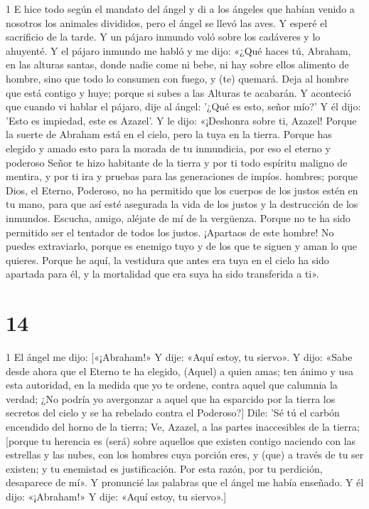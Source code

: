 \par 1 E hice todo según el mandato del ángel y di a los ángeles que habían venido a nosotros los animales divididos, pero el ángel se llevó las aves. Y esperé el sacrificio de la tarde. Y un pájaro inmundo voló sobre los cadáveres y lo ahuyenté. Y el pájaro inmundo me habló y me dijo: «¿Qué haces tú, Abraham, en las alturas santas, donde nadie come ni bebe, ni hay sobre ellos alimento de hombre, sino que todo lo consumen con fuego, y (te) quemará. Deja al hombre que está contigo y huye; porque si subes a las Alturas te acabarán. Y aconteció que cuando vi hablar el pájaro, dije al ángel: '¿Qué es esto, señor mío?' Y él dijo: 'Esto es impiedad, este es Azazel'. Y le dijo: «¡Deshonra sobre ti, Azazel! Porque la suerte de Abraham está en el cielo, pero la tuya en la tierra. Porque has elegido y amado esto para la morada de tu inmundicia, por eso el eterno y poderoso Señor te hizo habitante de la tierra y por ti todo espíritu maligno de mentira, y por ti ira y pruebas para las generaciones de impíos. hombres; porque Dios, el Eterno, Poderoso, no ha permitido que los cuerpos de los justos estén en tu mano, para que así esté asegurada la vida de los justos y la destrucción de los inmundos. Escucha, amigo, aléjate de mí de la vergüenza. Porque no te ha sido permitido ser el tentador de todos los justos. ¡Apartaos de este hombre! No puedes extraviarlo, porque es enemigo tuyo y de los que te siguen y aman lo que quieres. Porque he aquí, la vestidura que antes era tuya en el cielo ha sido apartada para él, y la mortalidad que era suya ha sido transferida a ti».

\chapter{14}

\par 1 El ángel me dijo: [«¡Abraham!» Y dije: «Aquí estoy, tu siervo». Y dijo: «Sabe desde ahora que el Eterno te ha elegido, (Aquel) a quien amas; ten ánimo y usa esta autoridad, en la medida que yo te ordene, contra aquel que calumnia la verdad; ¿No podría yo avergonzar a aquel que ha esparcido por la tierra los secretos del cielo y se ha rebelado contra el Poderoso?] Dile: 'Sé tú el carbón encendido del horno de la tierra; Ve, Azazel, a las partes inaccesibles de la tierra; [porque tu herencia es (será) sobre aquellos que existen contigo naciendo con las estrellas y las nubes, con los hombres cuya porción eres, y (que) a través de tu ser existen; y tu enemistad es justificación. Por esta razón, por tu perdición, desaparece de mí». Y pronuncié las palabras que el ángel me había enseñado. Y él dijo: «¡Abraham!» Y dije: «Aquí estoy, tu siervo».]

